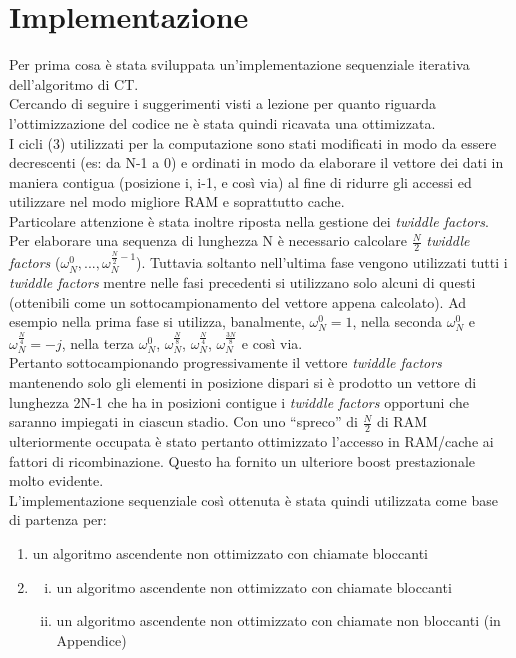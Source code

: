 \documentclass[12pt,a4paper,oneside,openright]{article}
\begin{document}
\section{Implementazione}
Per prima cosa è stata sviluppata un'implementazione sequenziale iterativa dell'algoritmo di CT.\\ Cercando di seguire i suggerimenti visti a lezione per quanto riguarda l'ottimizzazione del codice ne è stata quindi ricavata una ottimizzata.\\ I cicli (3) utilizzati per la computazione sono stati modificati in modo da essere decrescenti (es: da N-1 a 0) e ordinati in modo da elaborare il vettore dei dati in maniera contigua (posizione i, i-1, e così via) al fine di ridurre gli accessi ed utilizzare nel modo migliore RAM e soprattutto cache.\\
Particolare attenzione è stata inoltre riposta nella gestione dei \emph{twiddle factors}.\\
Per elaborare una sequenza di lunghezza N è necessario calcolare $\frac{N}{2}$ \emph{twiddle factors} ($ \omega_{N}^{0},...,\omega_{N}^{\frac{N}{2}-1}$). Tuttavia soltanto nell'ultima fase vengono utilizzati tutti i \emph{twiddle factors} mentre nelle fasi precedenti si utilizzano solo alcuni di questi (ottenibili come un sottocampionamento del vettore appena calcolato). Ad esempio nella prima fase si utilizza, banalmente, $ \omega_{N}^{0}=1$, nella seconda $ \omega_{N}^{0}$ e $\omega_{N}^{\frac{N}{4}}=-j$, nella terza $ \omega_{N}^{0}$, $\omega_{N}^{\frac{N}{8}}$, $\omega_{N}^{\frac{N}{4}}$, $\omega_{N}^{\frac{3N}{8}}$ e così via.\\
Pertanto sottocampionando progressivamente il vettore \emph{twiddle factors} mantenendo solo gli elementi in posizione dispari si è prodotto un vettore di lunghezza 2N-1 che ha in posizioni contigue i \emph{twiddle factors} opportuni che saranno impiegati in ciascun stadio. Con uno ``spreco'' di $\frac{N}{2}$ di RAM ulteriormente occupata è stato pertanto ottimizzato l'accesso in RAM/cache ai fattori di ricombinazione. Questo ha fornito un ulteriore boost prestazionale molto evidente.\\
L'implementazione sequenziale così ottenuta è stata quindi utilizzata come base di partenza per:
\begin{enumerate}
\item un algoritmo ascendente non ottimizzato con chiamate bloccanti
\item 
\begin{enumerate}[i.]
\item  un algoritmo ascendente non ottimizzato con chiamate bloccanti
\item un algoritmo ascendente non ottimizzato con chiamate non bloccanti (in Appendice)
\end{enumerate}
\end{enumerate}
\end{document}
